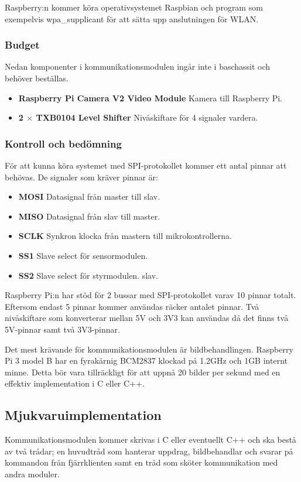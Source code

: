 \documentclass[designspec/spec.tex]{subfiles}
\begin{document}
Raspberry:n kommer köra operativsystemet Raspbian och program som exempelvis
wpa\_supplicant för att sätta upp anslutningen för WLAN.

\subsubsection{Budget}
    Nedan komponenter i kommunikationsmodulen ingår inte i baschassit och
    behöver beställas.
\begin{itemize}
    \item \textbf{Raspberry Pi Camera V2 Video Module} Kamera till Raspberry
    Pi.
    \item \textbf{2 $\times$ TXB0104 Level Shifter} Nivåskiftare för 4 signaler
    vardera.
\end{itemize}

\subsubsection{Kontroll och bedömning}
För att kunna köra systemet med SPI-protokollet kommer ett antal pinnar att
behövas. De signaler som kräver pinnar är:
\begin{itemize}
    \item \textbf{MOSI} Datasignal från master till slav.
    \item \textbf{MISO} Datasignal från slav till master.
    \item \textbf{SCLK} Synkron klocka från mastern till mikrokontrollerna.
    \item \textbf{SS1} Slave select för sensormodulen.
    \item \textbf{SS2} Slave select för styrmodulen.
    slav.
\end{itemize}
Raspberry Pi:n har stöd för 2 bussar med SPI-protokollet varav 10 pinnar
totalt. Eftersom endast 5 pinnar kommer användas räcker antalet pinnar.  Två
nivåskiftare som konverterar mellan 5V och 3V3 kan användas då det finns två
5V-pinnar samt två 3V3-pinnar.

Det mest krävande för kommunikationsmodulen är bildbehandlingen. Raspberry Pi
3 model B har en fyrakärnig BCM2837 klockad på 1.2GHz och 1GB internt minne.
Detta bör vara tillräckligt för att uppnå 20 bilder per sekund med en effektiv
implementation i C eller C++.

\subsection{Mjukvaruimplementation}
Kommunikationsmodulen kommer skrivas i C eller eventuellt C++ och ska bestå av
två trådar; en huvudtråd som hanterar uppdrag, bildbehandlar och svarar på
kommandon från fjärrklienten samt en tråd som sköter kommunikation med andra
moduler.
\end{document}
